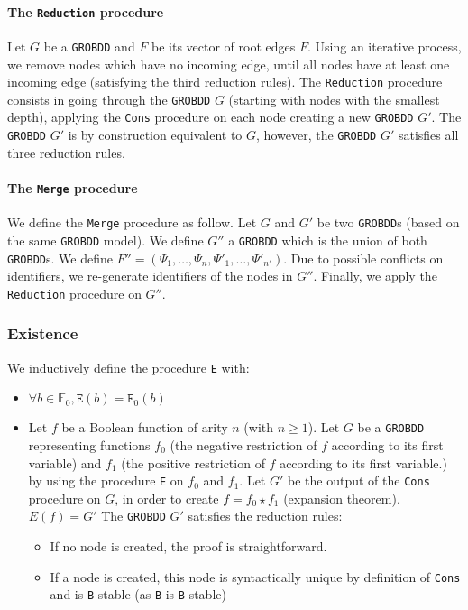 \documentclass[a4paper,10pt]{article}
\newcommand{\F}{\mathbb{F}}
\newcommand{\GroBdd}{\texttt{GROBDD}}
\begin{document}
\paragraph{The \texttt{Reduction} procedure\\}
Let $G$ be a \GroBdd{} and $F$ be its vector of root edges $F$.
Using an iterative process, we remove nodes which have no incoming edge, until all nodes have at least one incoming edge (satisfying the third reduction rules).
The \texttt{Reduction} procedure consists in going through the \GroBdd{} $G$ (starting with nodes with the smallest depth), applying the \texttt{Cons} procedure on each node creating a new \GroBdd{} $G'$.
The \GroBdd{} $G'$ is by construction equivalent to $G$, however, the \GroBdd{} $G'$ satisfies all three reduction rules.

\paragraph{The \texttt{Merge} procedure\\}
We define the \texttt{Merge} procedure as follow.
Let $G$ and $G'$ be two \GroBdd{}s (based on the same \GroBdd{} model).
We define $G''$ a \GroBdd{} which is the union of both \GroBdd{}s.
We define $F'' = (\Psi_1, \dots, \Psi_n, \Psi'_1, \dots, \Psi'_{n'})$.
Due to possible conflicts on identifiers, we re-generate identifiers of the nodes in $G''$.
Finally, we apply the \texttt{Reduction} procedure on $G''$.

\subsubsection{Existence}
We inductively define the procedure \texttt{E} with:\begin{itemize}
\item $\forall b\in\F_0, \texttt{E}(b) = \texttt{E}_0(b)$
\item
Let $f$ be a Boolean function of arity $n$ (with $n \geq 1$).
Let $G$ be a \GroBdd{} representing functions $f_0$ (the negative restriction of $f$ according to its first variable) and $f_1$ (the positive restriction of $f$ according to its first variable.) by using the procedure \texttt{E} on $f_0$ and $f_1$.
Let $G'$ be the output of the \texttt{Cons} procedure on $G$, in order to create $f = f_0 \star f_1$ (expansion theorem).\\
$E(f) = G'$
The \GroBdd{} $G'$ satisfies the reduction rules:\begin{itemize}
\item If no node is created, the proof is straightforward.
\item If a node is created, this node is syntactically unique by definition of \texttt{Cons} and is \texttt{B}-stable  (as \texttt{B} is \texttt{B}-stable)
\end{itemize}
\end{itemize}
\end{document}
